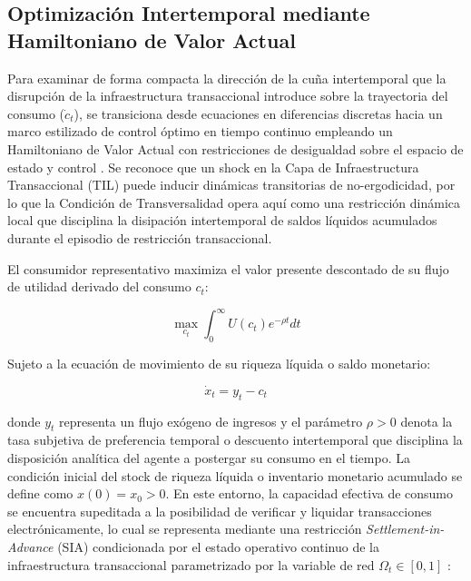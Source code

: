 \subsection{Optimizaci\'on Intertemporal mediante Hamiltoniano de Valor Actual}
\label{sec:B_4}

Para examinar de forma compacta la direcci\'on de la cu\~na intertemporal que la disrupci\'on de la infraestructura transaccional introduce sobre la trayectoria del consumo ($\dot{c}_t$), se transiciona desde ecuaciones en diferencias discretas hacia un marco estilizado de control \'optimo en tiempo continuo empleando un Hamiltoniano de Valor Actual con restricciones de desigualdad sobre el espacio de estado y control \citep{alvarez2009financial, chiang1999elements}. Se reconoce que un shock en la Capa de Infraestructura Transaccional (TIL) puede inducir din\'amicas transitorias de no-ergodicidad, por lo que la Condici\'on de Transversalidad opera aqu\'i como una restricci\'on din\'amica local que disciplina la disipaci\'on intertemporal de saldos l\'iquidos acumulados durante el episodio de restricci\'on transaccional.

El consumidor representativo maximiza el valor presente descontado de su flujo de utilidad derivado del consumo $c_t$:

\begin{equation}
\max_{c_t} \int_{0}^{\infty} U(c_t)e^{-\rho t}dt
\end{equation}

Sujeto a la ecuaci\'on de movimiento de su riqueza l\'iquida o saldo monetario:

\begin{equation}
\dot{x}_t = y_t - c_t
\end{equation}

donde $y_t$ representa un flujo ex\'ogeno de ingresos y el par\'ametro $\rho > 0$ denota la tasa subjetiva de preferencia temporal o descuento intertemporal que disciplina la disposici\'on anal\'itica del agente a postergar su consumo en el tiempo. La condici\'on inicial del stock de riqueza l\'iquida o inventario monetario acumulado se define como $x(0) = x_0 > 0$. En este entorno, la capacidad efectiva de consumo se encuentra supeditada a la posibilidad de verificar y liquidar transacciones electr\'onicamente, lo cual se representa mediante una restricci\'on \textit{Settlement-in-Advance} (SIA) condicionada por el estado operativo continuo de la infraestructura transaccional parametrizado por la variable de red $\Omega_t \in [0,1]$ \citep{crouzet2023shocks}:

